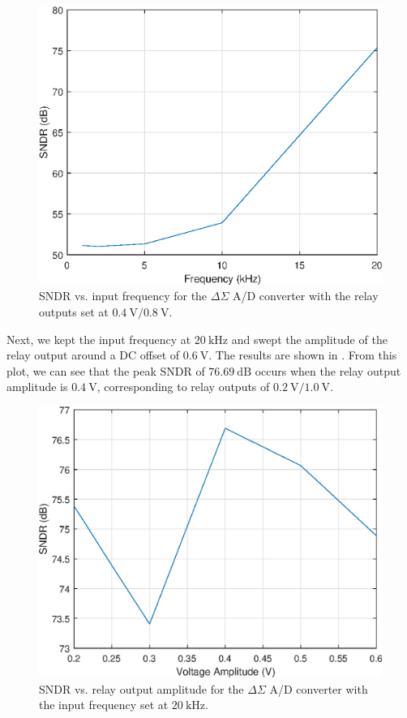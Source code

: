 \documentclass[journal,hidelinks]{IEEEtran}
\begin{document}
\begin{figure}[!htb]
  \centering
  \includegraphics[width=0.8\columnwidth]{simulation/adc_sim_freq.eps}
  \caption{SNDR vs. input frequency for the $\Delta \Sigma$ A/D converter with the relay outputs set at $\SI{0.4}{\volt}/\SI{0.8}{\volt}$.}
  \label{fig:sim_freq}
\end{figure}

Next, we kept the input frequency at $\SI{20}{\kilo\hertz}$ and swept the amplitude of the relay output around a DC offset of $\SI{0.6}{\volt}$. The results are shown in . From this plot, we can see that the peak SNDR of $\SI{76.69}{\deci\bel}$ occurs when the relay output amplitude is $\SI{0.4}{\volt}$, corresponding to relay outputs of $\SI{0.2}{\volt}/\SI{1.0}{\volt}$.

\begin{figure}[!htb]
  \centering
  \includegraphics[width=0.8\columnwidth]{simulation/adc_sim_vo.eps}
  \caption{SNDR vs. relay output amplitude for the $\Delta \Sigma$ A/D converter with the input frequency set at $\SI{20}{\kilo\hertz}$.}
  \label{fig:sim_vo}
\end{figure}
\end{document}
